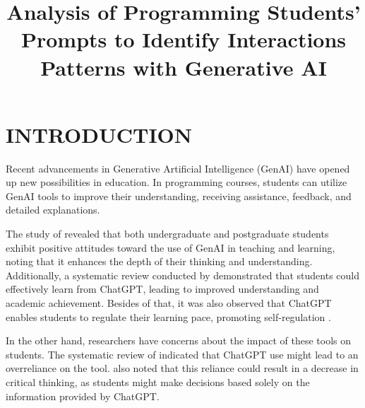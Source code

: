 \documentclass[a4paper,twoside]{article}
\begin{document}
\title{Analysis of Programming Students' Prompts to Identify Interactions
Patterns with Generative AI}

\author{
}



\twocolumn\maketitle\normalsize\setcounter{footnote}{0}

\section{\uppercase{Introduction}}
\label{sec:introduction}


Recent advancements in Generative Artificial Intelligence (GenAI) have opened
up new possibilities in education. In programming courses, students can utilize
GenAI tools to improve their understanding, receiving assistance, feedback, and
detailed explanations.

The study of \cite{chan23} revealed that both undergraduate and postgraduate
students exhibit positive attitudes toward the use of GenAI in teaching and
learning, noting that it enhances the depth of their thinking and understanding.
Additionally, a systematic review conducted by \cite{Lo24} demonstrated that
students could effectively learn from ChatGPT, leading to improved understanding
and academic achievement. Besides of that, it was also observed that ChatGPT
enables students to regulate their learning pace, promoting self-regulation
\citep{Baha24} \citep{cai23}.

In the other hand, researchers have concerns about the impact of these
tools on students. The systematic review of \cite{Murillo23} indicated that
ChatGPT use might lead to an overreliance on the tool. \cite{chan23} also noted
that this reliance could result in a decrease in critical thinking, as students
might make decisions based solely on the information provided by ChatGPT.
\end{document}
